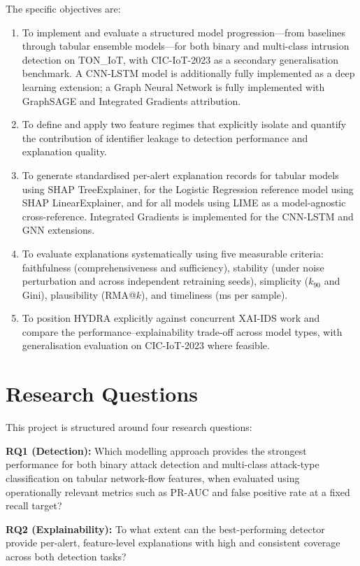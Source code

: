 \documentclass[12pt,a4paper]{report}
\begin{document}
The specific objectives are:
\begin{enumerate}
  \item To implement and evaluate a structured model progression---from baselines through tabular ensemble models---for both binary and multi-class intrusion detection on TON\_IoT, with CIC-IoT-2023 as a secondary generalisation benchmark. A CNN-LSTM model is additionally fully implemented as a deep learning extension; a Graph Neural Network is fully implemented with GraphSAGE and Integrated Gradients attribution.
  \item To define and apply two feature regimes that explicitly isolate and quantify the contribution of identifier leakage to detection performance and explanation quality.
  \item To generate standardised per-alert explanation records for tabular models using SHAP TreeExplainer, for the Logistic Regression reference model using SHAP LinearExplainer, and for all models using LIME as a model-agnostic cross-reference. Integrated Gradients is implemented for the CNN-LSTM and GNN extensions.
  \item To evaluate explanations systematically using five measurable criteria: faithfulness (comprehensiveness and sufficiency), stability (under noise perturbation and across independent retraining seeds), simplicity ($k_{90}$ and Gini), plausibility (RMA@$k$), and timeliness (ms per sample).
  \item To position HYDRA explicitly against concurrent XAI-IDS work and compare the performance--explainability trade-off across model types, with generalisation evaluation on CIC-IoT-2023 where feasible.
\end{enumerate}

\section{Research Questions}
\label{sec:rqs}

This project is structured around four research questions:

\noindent\textbf{RQ1 (Detection):} Which modelling approach provides the strongest performance for both binary attack detection and multi-class attack-type classification on tabular network-flow features, when evaluated using operationally relevant metrics such as PR-AUC and false positive rate at a fixed recall target?

\noindent\textbf{RQ2 (Explainability):} To what extent can the best-performing detector provide per-alert, feature-level explanations with high and consistent coverage across both detection tasks?
\end{document}
